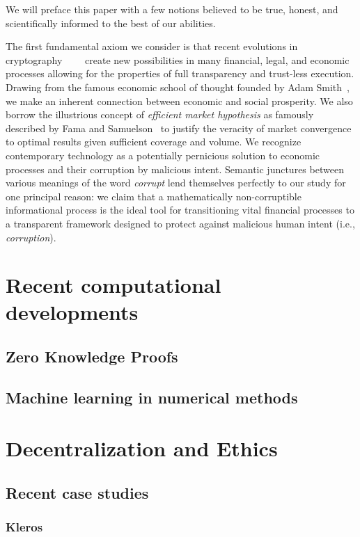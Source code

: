 \documentclass[11pt]{article}
\begin{document}
We will preface this paper with a few notions believed to be true, honest, and scientifically informed to the best of our abilities.

The first fundamental axiom we consider is that recent evolutions in cryptography~\cite{ernstberger_2024_do}~\cite{kuznetsov_2024_enhanced}~\cite{nadler_2023_tornado}~\cite{shahlaatapoor_2023_vss} create new possibilities in many financial, legal, and economic processes allowing for the properties of full transparency and trust-less execution. Drawing from the famous economic school of thought founded by Adam Smith~\cite{smith_1776_the}, we make an inherent connection between economic and social prosperity. We also borrow the illustrious concept of \textit{efficient market hypothesis} as famously described by Fama and Samuelson~\cite{delcey_2019_samuelson} to justify the veracity of market convergence to optimal results given sufficient coverage and volume. We recognize contemporary technology as a potentially pernicious solution to economic processes and their corruption by malicious intent. Semantic junctures between various meanings of the word \textit{corrupt} lend themselves perfectly to our study for one principal reason: we claim that a mathematically non-corruptible informational process is the ideal tool for transitioning vital financial processes to a transparent framework designed to protect against malicious human intent (i.e., \textit{corruption}).

\section{Recent computational developments}
\subsection{Zero Knowledge Proofs}
\subsection{Machine learning in numerical methods}


\section{Decentralization and Ethics}
\subsection{Recent case studies}
\subsubsection{Kleros~\cite{zhuk_2023_applying}}
\end{document}
